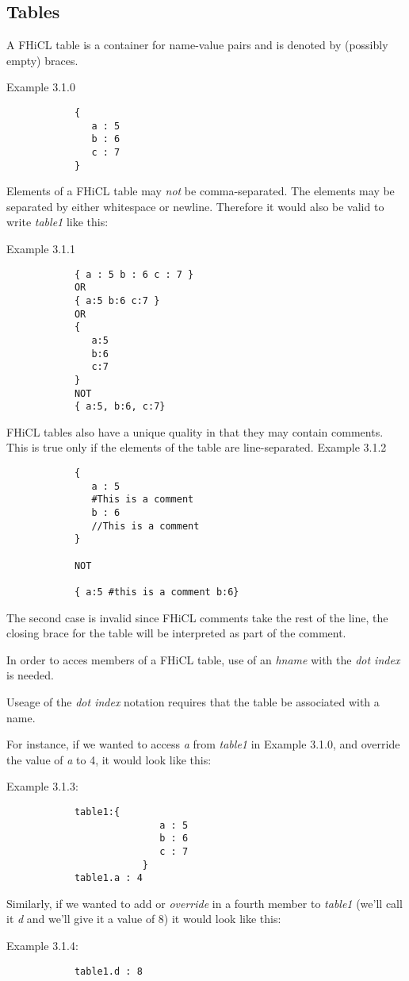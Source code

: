 \documentclass{article}
\begin{document}
	\subsection{Tables}
		A FHiCL table is a container for name-value pairs
		and is denoted by (possibly empty) braces.
		\par
		Example 3.1.0
		\begin{verbatim}
			{
			   a : 5
			   b : 6
			   c : 7
			}
		\end{verbatim}
		\par
		Elements of a FHiCL table may \emph{not} be comma-separated.
		The elements may be separated by either whitespace or newline.
		Therefore it would also be valid to write \emph{table1} like this:
		\par
		Example 3.1.1
		\begin{verbatim}
			{ a : 5 b : 6 c : 7 }
			OR
			{ a:5 b:6 c:7 }
			OR
			{
			   a:5
			   b:6
			   c:7
			}
			NOT
			{ a:5, b:6, c:7}
		\end{verbatim}
		\par
		FHiCL tables also have a unique quality in that they may contain comments.
		This is true only if the elements of the table are line-separated.
		Example 3.1.2
		\begin{verbatim}
			{
			   a : 5
			   #This is a comment
			   b : 6
			   //This is a comment
			}

			NOT

			{ a:5 #this is a comment b:6}
		\end{verbatim}
		\par
		The second case is invalid since FHiCL comments take the rest of the line,
		the closing brace for the table will be interpreted as part of the comment.
		\par
		In order to acces members of a FHiCL table, use of an \emph{hname}
		with the \emph{dot index} is needed.
		\par
		Useage of the \emph{dot index} notation requires that the table be associated with a name.
		\par
		For instance, if we wanted to access \emph{a} from \emph{table1} in Example 3.1.0,
		and override the value of \emph{a} to 4, it would look like this:
		\par
		Example 3.1.3:
		\begin{verbatim}
			table1:{
                           a : 5
                           b : 6
                           c : 7
                        }
			table1.a : 4
		\end{verbatim}
		\par
		Similarly, if we wanted to add or \emph{override} in a fourth member to \emph{table1}
		(we'll call it \emph{d} and we'll give it a value of 8)
		it would look like this:
		\par
		Example 3.1.4:
		\begin{verbatim}
			table1.d : 8
		\end{verbatim}
		\par
\end{document}
